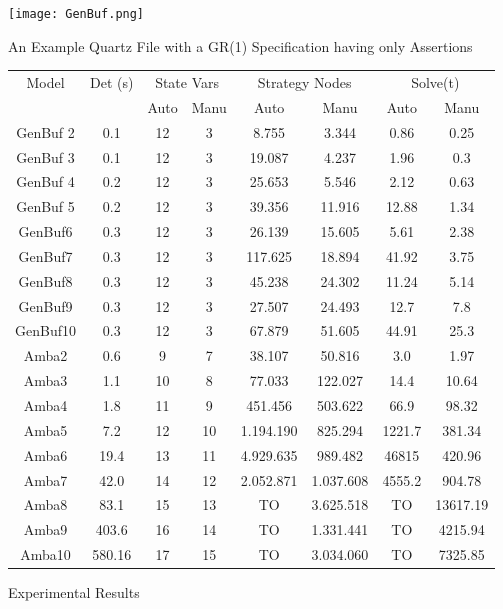 \documentclass[submission,copyright,creativecommons]{eptcs}
\begin{document}
\begin{figure}
\texttt{[image: GenBuf.png]}
\caption{An Example Quartz File with a GR(1) Specification having only Assertions}
\label{fig:example_spec}	
\end{figure}


\begin{figure}[ht]
\centering
\begin{tabular}{|c|c|cc|cc|cc|}
	\hline
	Model & Det (s) & \multicolumn{2}{c|}{State Vars}& \multicolumn{2}{c|}{Strategy Nodes}& \multicolumn{2}{c|}{Solve(t)} \\
	& & Auto & Manu & Auto & Manu &Auto & Manu\\
	\hline
	GenBuf 2 & 0.1 & 12 & 3&8.755&3.344& 0.86 & 0.25\\
	GenBuf 3 & 0.1 & 12 &3&19.087&4.237& 1.96 & 0.3\\
	GenBuf 4 & 0.2 & 12 &3&25.653&5.546& 2.12 & 0.63\\
	GenBuf 5 & 0.2 &12 &3&39.356&11.916& 12.88 & 1.34\\
	GenBuf6 & 0.3 &12&3&26.139&15.605& 5.61 & 2.38\\
	GenBuf7 & 0.3 &12&3&117.625&18.894& 41.92 & 3.75\\
	GenBuf8 & 0.3 &12&3&45.238&24.302& 11.24 & 5.14\\
	GenBuf9 & 0.3 &12&3&27.507&24.493& 12.7 & 7.8\\
	GenBuf10 & 0.3 &12 &3&67.879&51.605& 44.91& 25.3\\
	Amba2 & 0.6 &9&7&38.107&50.816& 3.0 & 1.97\\
	Amba3 & 1.1 &10&8&77.033&122.027& 14.4& 10.64\\
	Amba4 & 1.8 &11&9&451.456&503.622& 66.9 & 98.32\\
	Amba5 & 7.2 &12&10&1.194.190&825.294& 1221.7 & 381.34\\
	Amba6 & 19.4 &13&11&4.929.635&989.482&  46815 & 420.96\\
	Amba7 & 42.0 &14&12&2.052.871&1.037.608&  4555.2 & 904.78 \\
	Amba8 &  83.1 &15&13&TO&3.625.518& TO & 13617.19\\
	Amba9 & 403.6 &16&14&TO&1.331.441& TO & 4215.94\\
	Amba10 & 580.16 &17&15&TO&3.034.060& TO & 7325.85\\
	\hline
\end{tabular}	
\caption{Experimental Results}
\label{fig:experiments}
\end{figure}
\end{document}
